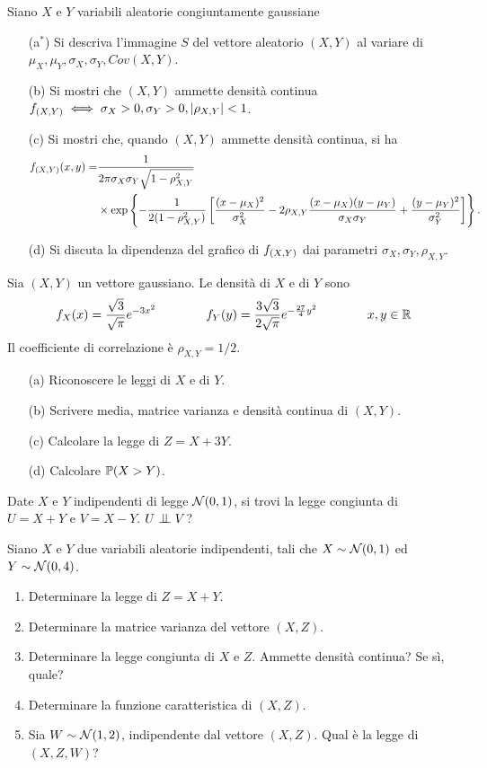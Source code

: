 \Esercizio{} %
Siano $X$ e $Y$ variabili aleatorie congiuntamente gaussiane
\begin{enumerate}
\item [(a$^*$)] Si descriva l'immagine $S$ del vettore aleatorio $(X,Y)$ al variare di $\mu_X,\mu_Y,\sigma_X,\sigma_Y, Cov(X,Y)$.
\item [(b)] Si mostri che $(X,Y)$ ammette densità continua $f_{(X,Y)}\iff\sigma_X>0,\sigma_Y>0,|\rho_{X,Y}|<1$.
\item [(c)] Si mostri che, quando $(X,Y)$ ammette densità continua, si ha
\begin{gather*}
\begin{aligned}
f_{(X,Y)}(x,y)=&\frac{1}{2\pi\sigma_X\sigma_Y\sqrt{1-\rho_{X,Y}^2}}\\ &\times\exp\left\{-\frac{1}{2(1-\rho_{X,Y}^2)}\left[\frac{(x-\mu_X)^2}{\sigma_X^2}-2\rho_{X,Y}\frac{(x-\mu_X)(y-\mu_Y)}{\sigma_X\sigma_Y}+\frac{(y-\mu_Y)^2}{\sigma_Y^2}  \right]\right\}.
\end{aligned}
\end{gather*}
\item [(d)] Si discuta la dipendenza del grafico di $f_{(X,Y)}$ dai parametri $\sigma_X,\sigma_Y,\rho_{X,Y}$.
\end{enumerate}

\Esercizio{} %
Sia $(X,Y)$ un vettore gaussiano. Le densità di $X$ e di $Y$ sono
\[
f_X(x)=\frac{\sqrt{3}}{\sqrt{\pi}}e^{-3x^2}\qquad\qquad f_Y(y)=\frac{3\sqrt{3}}{2\sqrt{\pi}}e^{-\frac{27}{4}y^2}\qquad\qquad x,y\in\mathbb{R}
\]
Il coefficiente di correlazione è $\rho_{X,Y}=1/2$.
\begin{enumerate}
\item [(a)] Riconoscere le leggi di $X$ e di $Y$.
\item [(b)] Scrivere media, matrice varianza e densità continua di $(X,Y)$.
\item [(c)] Calcolare la legge di $Z=X+3Y$.
\item [(d)] Calcolare $\mathbb{P}(X>Y)$.
\end{enumerate}

\Esercizio{} %
Date $X$ e $Y$ indipendenti di legge $\mathcal{N}(0,1)$, si trovi la legge congiunta di $U=X+Y$ e $V=X-Y$. $U\indep V$?

\Esercizio{} %
Siano $X$ e $Y$ due variabili aleatorie indipendenti, tali che $X\sim\mathcal{N}(0,1)$ ed $Y\sim\mathcal{N}(0,4)$.
\begin{enumerate}
\item Determinare la legge di $Z=X+Y$.
\item Determinare la matrice varianza del vettore $(X,Z)$.
\item Determinare la legge congiunta di $X$ e $Z$. Ammette densità continua? Se sì, quale?
\item Determinare la funzione caratteristica di $(X,Z)$.
\item Sia $W\sim\mathcal{N}(1,2)$, indipendente dal vettore $(X,Z)$. Qual è la legge di $(X,Z,W)$?
\end{enumerate}

